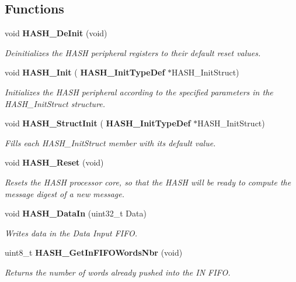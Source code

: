 \subsection*{Functions}
\begin{DoxyCompactItemize}
\item 
void \textbf{ H\+A\+S\+H\+\_\+\+De\+Init} (void)
\begin{DoxyCompactList}\small\item\em Deinitializes the H\+A\+SH peripheral registers to their default reset values. \end{DoxyCompactList}\item 
void \textbf{ H\+A\+S\+H\+\_\+\+Init} (\textbf{ H\+A\+S\+H\+\_\+\+Init\+Type\+Def} $\ast$H\+A\+S\+H\+\_\+\+Init\+Struct)
\begin{DoxyCompactList}\small\item\em Initializes the H\+A\+SH peripheral according to the specified parameters in the H\+A\+S\+H\+\_\+\+Init\+Struct structure. \end{DoxyCompactList}\item 
void \textbf{ H\+A\+S\+H\+\_\+\+Struct\+Init} (\textbf{ H\+A\+S\+H\+\_\+\+Init\+Type\+Def} $\ast$H\+A\+S\+H\+\_\+\+Init\+Struct)
\begin{DoxyCompactList}\small\item\em Fills each H\+A\+S\+H\+\_\+\+Init\+Struct member with its default value. \end{DoxyCompactList}\item 
void \textbf{ H\+A\+S\+H\+\_\+\+Reset} (void)
\begin{DoxyCompactList}\small\item\em Resets the H\+A\+SH processor core, so that the H\+A\+SH will be ready to compute the message digest of a new message. \end{DoxyCompactList}\item 
void \textbf{ H\+A\+S\+H\+\_\+\+Data\+In} (uint32\+\_\+t Data)
\begin{DoxyCompactList}\small\item\em Writes data in the Data Input F\+I\+FO. \end{DoxyCompactList}\item 
uint8\+\_\+t \textbf{ H\+A\+S\+H\+\_\+\+Get\+In\+F\+I\+F\+O\+Words\+Nbr} (void)
\begin{DoxyCompactList}\small\item\em Returns the number of words already pushed into the IN F\+I\+FO. \end{DoxyCompactList}\item 

\end{DoxyCompactItemize}
